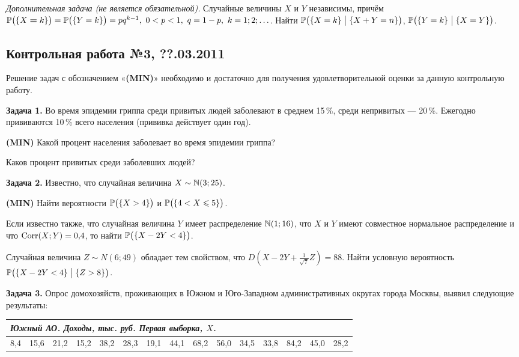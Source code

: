 \documentclass[12pt, a4paper]{article}\usepackage[]{graphicx}\usepackage[]{color}
\newenvironment{enumerate*}{
\begin{enumerate}
  \setlength{\itemsep}{0pt}
  \setlength{\parskip}{0pt}
  \setlength{\parsep}{0pt}
}{\end{enumerate}}
\newcommand{\MIN}{\textbf{(MIN)}{}}
\begin{document}
\emph{Дополнительная задача (не является обязательной).} Случайные величины $X$ и $Y$ независимы, причём $\P\bigl(\{X\hm=k\}\bigr)=\P\bigl(\{Y=k\}\bigr)=pq^{k-1},\ 0<p<1,\ q=1-p,\ k=1;2;\ldots$. Найти $\P\bigl(\{X=k\} \bigm| \{X+Y=n\}\bigr)$, $\P\bigl(\{Y=k\}\bigm| \{X=Y\}\bigr)$.

\subsection{Контрольная работа №3, ??.03.2011}

Решение задач с обозначением «\MIN{}» необходимо и достаточно для получения удовлетворительной оценки за данную контрольную работу.\par\smallskip

\textbf{Задача 1.} Во время эпидемии гриппа среди привитых людей заболевают в среднем 15\,\%, среди непривитых — 20\,\%. Ежегодно прививаются 10\,\% всего населения (прививка действует один год).
\begin{enumerate*}
\item \MIN{} Какой процент населения заболевает во время эпидемии гриппа?
\item Каков процент привитых среди заболевших людей?
\end{enumerate*}

\textbf{Задача 2.} Известно, что случайная величина $X\sim\N(3;25)$.
\begin{enumerate*}
\item \MIN{} Найти вероятности $\P\bigl(\{X>4\}\bigr)$ и $\P\bigl(\{4<X\leqslant 5\}\bigr)$.
\item Если известно также, что случайная величина $Y$ имеет распределение $\N(1;16)$, что $X$ и $Y$ имеют совместное нормальное распределение и что $\Corr(X;Y)=0{,}4$, то найти $\P\bigl(\{X-2Y<4\}\bigr)$.
\item Случайная величина $Z\sim N(6;49)$ обладает тем свойством, что $D\left(X-2Y+\frac{1}{\sqrt{7}}Z\right)=88$. Найти условную вероятность $\P\bigl(\{X-2Y<4\} \bigm| \{Z>8\}\bigr)$.
\end{enumerate*}

\textbf{Задача 3.} Опрос домохозяйств, проживающих в Южном и Юго-Западном административных округах города Москвы, выявил следующие результаты:
\par\smallskip
\begin{tabular}{|p{6mm}|p{6mm}|p{6mm}|p{6mm}|p{6mm}|p{6mm}|p{6mm}|p{6mm}|p{6mm}|p{6mm}|p{6mm}|p{6mm}|p{6mm}|p{6mm}|p{6mm}|}
\multicolumn{15}{l}{\emph{Южный АО. Доходы, тыс. руб. Первая выборка, $X$.}}\\ \hline
8{,}4 & 15{,}6 & 21{,}2 & 15{,}2 & 38{,}2 & 28{,}3 & 19{,}1 & 44{,}1 & 68{,}2 & 56{,}0 & 34{,}5 & 33{,}8 & 84{,}2 & 45{,}0 & 28{,}2 \\ \hline
\end{tabular}\par\smallskip
\end{document}
